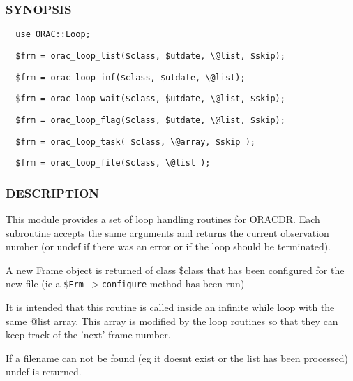 \begin{description}
\begin{description}
\subsubsection*{SYNOPSIS\label{ORAC::Loop_SYNOPSIS}}
\begin{verbatim}
  use ORAC::Loop;
\end{verbatim}
\begin{verbatim}
  $frm = orac_loop_list($class, $utdate, \@list, $skip);
\end{verbatim}
\begin{verbatim}
  $frm = orac_loop_inf($class, $utdate, \@list);
\end{verbatim}
\begin{verbatim}
  $frm = orac_loop_wait($class, $utdate, \@list, $skip);
\end{verbatim}
\begin{verbatim}
  $frm = orac_loop_flag($class, $utdate, \@list, $skip);
\end{verbatim}
\begin{verbatim}
  $frm = orac_loop_task( $class, \@array, $skip );
\end{verbatim}
\begin{verbatim}
  $frm = orac_loop_file($class, \@list );
\end{verbatim}
\subsubsection*{DESCRIPTION\label{ORAC::Loop_DESCRIPTION}}


This module provides a set of loop handling routines for ORACDR.
Each subroutine accepts the same arguments and returns the current
observation number (or undef if there was an error or if the loop
should be terminated).



A new  Frame object is returned of class \$class that has been configured
for the new file (ie a \texttt{\$Frm-$>$configure} method has been run)



It is intended that this routine is called inside an infinite while
loop with the same @list array. This array is modified by the loop
routines so that they can keep track of the 'next' frame number.



If a filename can not be found (eg it doesnt exist or the list has
been processed) undef is returned.




\end{description}
\end{description}
